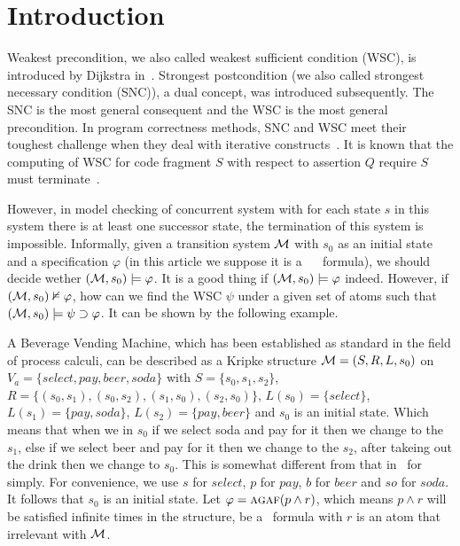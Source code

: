 \documentclass{article}
\begin{document}
\section{Introduction}
Weakest precondition, we also called weakest sufficient condition (WSC), is introduced by Dijkstra in~\cite{dijkstra1978guarded}.
Strongest postcondition (we also called strongest necessary condition (SNC)), a dual concept, was introduced subsequently.
The SNC is the most general consequent and the WSC is the most general precondition.
In program correctness methods, SNC and WSC meet their toughest challenge when
they deal with iterative constructs~\cite{mraihi2011computing}.
It is known that the computing of WSC for code fragment $S$ with respect to assertion $Q$  require $S$  must terminate~\cite{tremblay1996logic}.


However, in model checking of concurrent system with for each state $s$ in this system there is at least one successor state, the termination of this system is impossible.
Informally, given a transition system ${\cal M}$ with $s_0$ as an initial state and a specification $\varphi$ (in this article we suppose it is a \CTL\ ~\cite{clarke1981design} formula), we should decide wether $({\cal M}, s_0) \models \varphi$. It is a good thing if $({\cal M}, s_0) \models \varphi$ indeed. However, if $({\cal M}, s_0) \nvDash \varphi$, how can we find the WSC $\psi$ under a given set of atoms such that $({\cal M}, s_0) \models \psi \supset \varphi$.
It can be shown by the following example.

\begin{example}\label{exmp:1}
A Beverage Vending Machine, which has been established as standard in the field of process calculi, can be described as a Kripke structure ${\cal M}=(S, R, L, s_0)$ on $V_a=\{select, pay, beer, soda\}$ with $S=\{s_0, s_1, s_2\}$, $R=\{(s_0, s_1), (s_0, s_2), (s_1, s_0), (s_2,s_0)\}$, $L(s_0)=\{select\}$, $L(s_1)=\{pay, soda\}$, $L(s_2)=\{pay, beer\}$ and $s_0$ is an initial state.
Which means that when we in $s_0$ if we select soda and pay for it then we change to the $s_1$, else if we select beer and pay for it then we change to the $s_2$, after takeing out the drink then we change to $s_0$. This is somewhat different from that in~\cite{Baier:PMC:2008} for simply.
For convenience, we use $s$ for $select$, $p$ for $pay$, $b$ for $beer$ and $so$ for $soda$.
It follows that $s_0$ is an initial state.
Let $\varphi=\textsc{a}\textsc{g} \textsc{a} \textsc{f}(p\wedge r)$, which means $p\wedge r$ will be satisfied infinite times in the structure, be a \CTL\ formula with $r$ is an atom that irrelevant with ${\cal M}$.
\end{example}
\end{document}
